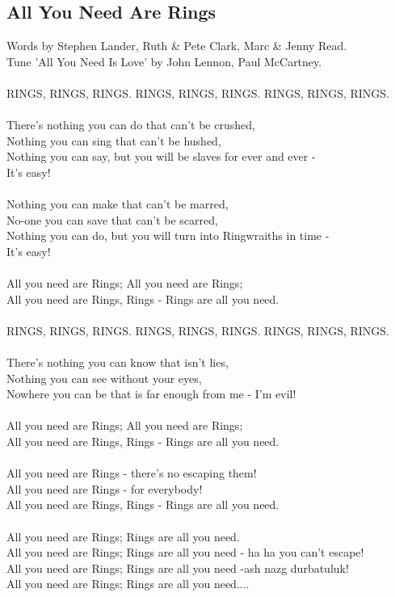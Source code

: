 \begin{multicols}{2}

\section{All You Need Are Rings}
Words by Stephen Lander, Ruth \& Pete Clark, Marc \& Jenny Read.
\\
Tune ’All You Need Is Love’ by John Lennon, Paul McCartney.
\\
\\
RINGS, RINGS, RINGS. RINGS, RINGS, RINGS. RINGS, RINGS, RINGS.
\\
\\
There’s nothing you can do that can’t be crushed,
\\
Nothing you can sing that can’t be hushed,
\\
Nothing you can say, but you will be slaves for ever and ever -
\\
It’s easy!
\\
\\
Nothing you can make that can’t be marred,
\\
No-one you can save that can’t be scarred,
\\
Nothing you can do, but you will turn into Ringwraiths in time -
\\
It’s easy!
\\
\\
All you need are Rings; All you need are Rings;
\\
All you need are Rings, Rings - Rings are all you need.
\\
\\
RINGS, RINGS, RINGS. RINGS, RINGS, RINGS. RINGS, RINGS, RINGS.
\\
\\
There’s nothing you can know that isn’t lies,
\\
Nothing you can see without your eyes,
\\
Nowhere you can be that is far enough from me - I’m evil!
\\
\\

All you need are Rings; All you need are Rings;
\\
All you need are Rings, Rings - Rings are all you need.
\\
\\
All you need are Rings - there’s no escaping them!
\\
All you need are Rings - for everybody!
\\
All you need are Rings, Rings - Rings are all you need.
\\
\\
All you need are Rings; Rings are all you need.
\\
All you need are Rings; Rings are all you need - ha ha you can’t escape!
\\
All you need are Rings; Rings are all you need -ash nazg durbatuluk!
\\
All you need are Rings; Rings are all you need....

\end{multicols}
